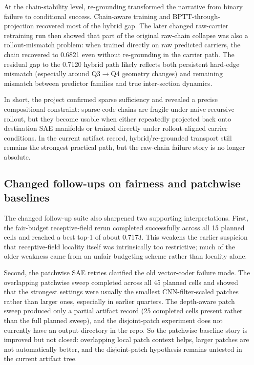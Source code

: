 \documentclass[11pt]{article}
\begin{document}
At the chain-stability level, re-grounding transformed the narrative from binary failure to conditional success. Chain-aware training and BPTT-through-projection recovered most of the hybrid gap. The later changed raw-carrier retraining run then showed that part of the original raw-chain collapse was also a rollout-mismatch problem: when trained directly on raw predicted carriers, the chain recovered to 0.6821 even without re-grounding in the carrier path. The residual gap to the 0.7120 hybrid path likely reflects both persistent hard-edge mismatch (especially around Q3$\rightarrow$Q4 geometry changes) and remaining mismatch between predictor families and true inter-section dynamics.

In short, the project confirmed sparse sufficiency and revealed a precise compositional constraint: sparse-code chains are fragile under naive recursive rollout, but they become usable when either repeatedly projected back onto destination SAE manifolds or trained directly under rollout-aligned carrier conditions. In the current artifact record, hybrid/re-grounded transport still remains the strongest practical path, but the raw-chain failure story is no longer absolute.

\subsection{Changed follow-ups on fairness and patchwise baselines}
The changed follow-up suite also sharpened two supporting interpretations. First, the fair-budget receptive-field rerun completed successfully across all 15 planned cells and reached a best top-1 of about 0.7173. This weakens the earlier suspicion that receptive-field locality itself was intrinsically too restrictive; much of the older weakness came from an unfair budgeting scheme rather than locality alone.

Second, the patchwise SAE retries clarified the old vector-coder failure mode. The overlapping patchwise sweep completed across all 45 planned cells and showed that the strongest settings were usually the smallest CNN-filter-scaled patches rather than larger ones, especially in earlier quarters. The depth-aware patch sweep produced only a partial artifact record (25 completed cells present rather than the full planned sweep), and the disjoint-patch experiment does not currently have an output directory in the repo. So the patchwise baseline story is improved but not closed: overlapping local patch context helps, larger patches are not automatically better, and the disjoint-patch hypothesis remains untested in the current artifact tree.
\end{document}
